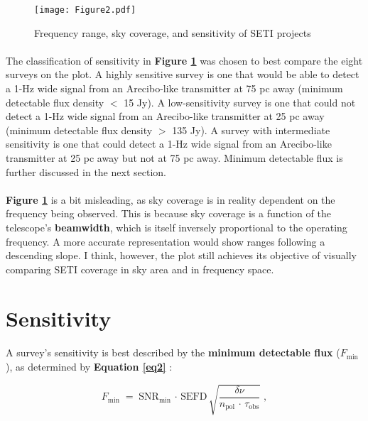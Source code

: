 \documentclass{article}
\begin{document}
\begin{figure}[H]
\begin{center}
\texttt{[image: Figure2.pdf]}
\caption{Frequency range, sky coverage, and sensitivity of SETI projects \textbf{\label{fig3}}}
\end{center}
\end{figure}

\paragraph{}
The classification of sensitivity in \textbf{Figure \ref{fig3}} was chosen to best compare the eight surveys on the plot. A highly sensitive survey is one that would be able to detect a 1-Hz wide signal from an Arecibo-like transmitter at 75 pc away (minimum detectable flux density $<$ 15 Jy). A low-sensitivity survey is one that could not detect a 1-Hz wide signal from an Arecibo-like transmitter at 25 pc away (minimum detectable flux density $>$ 135 Jy). A survey with intermediate sensitivity is one that could detect a 1-Hz wide signal from an Arecibo-like transmitter at 25 pc away but not at 75 pc away. Minimum detectable flux is further discussed in the next section.

\paragraph{}
\textbf{Figure \ref{fig3}} is a bit misleading, as sky coverage is in reality dependent on the frequency being observed. This is because sky coverage is a function of the telescope's \textbf{beamwidth}, which is itself inversely proportional to the operating frequency. A more accurate representation would show ranges following a descending slope. I think, however, the plot still achieves its objective of visually comparing SETI coverage in sky area and in frequency space.


\section{Sensitivity}

\paragraph{}
A survey's sensitivity is best described by the \textbf{minimum detectable flux} ($F_{\textrm{min}}$), as determined by \textbf{Equation \ref{eq2}} \citep{Price_2020}:

\begin{equation}
F_{\textrm{min}} \; = \; \textrm{SNR}_{\textrm{min}} \, \cdot \, \textrm{SEFD} \, \sqrt{\frac{\delta \nu}{n_{\textrm{pol}} \, \cdot \, \tau_{\textrm{obs}}}} \; ,
\label{eq2}
\end{equation}
\end{document}
